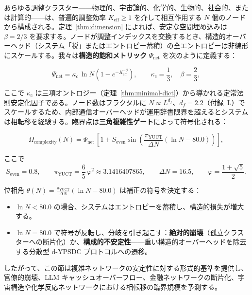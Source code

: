 \documentclass[12pt,a4paper]{article}
\newcommand{\Keff}{K_{\mathrm{eff}}}
\newcommand{\kappac}{\kappa_c}
\newcommand{\Seven}{S_{\mathrm{even}}}
\newcommand{\piYUCT}{\pi_{\mathrm{YUCT}}}
\theoremstyle{remark}
\begin{document}
	あらゆる調整クラスター——物理的、宇宙論的、化学的、生物的、社会的、または計算的——は、普遍的調整効率 \(\Keff \ge 1\) を介して相互作用する \(N\) 個のノードから構成される。定理~\ref{thm:dimension} によれば、安定な空間埋め込みは \(\beta = 2/3\) を要求する。ノードが調整インデックスを交換するとき、構造的オーバーヘッド（システム「税」またはエントロピー蓄積）の全エントロピーは非線形にスケールする。我々は\textbf{構造的飽和メトリック} \(\Psi_{\mathrm{net}}\) を次のように定義する：
	
	\begin{equation}
		\Psi_{\mathrm{net}} = \kappac \, \ln N \left(1 - e^{-\Keff^{-\beta}}\right),
		\qquad \kappac = \frac{1}{3},\quad \beta = \frac{2}{3},
		\label{eq:Psi_net}
	\end{equation}
	
	ここで \(\kappac\) は三項オントロジー（定理~\ref{thm:minimal-dict}）から導かれる定常法則安定化因子である。ノード数はフラクタルに \(N \propto L^{d_f}\)、\(d_f = 2.2\)（付録~L）でスケールするため、内部通信オーバーヘッドが運用辞書限界を超えるとシステムは相転移を経験する。臨界点は\textbf{三角複雑性ゲート}によって符号化される：
	
	\begin{equation}
		\Omega_{\mathrm{complexity}}(N) = \Psi_{\mathrm{net}} \,
		\left[1 + \Seven \sin\!\left( \frac{\piYUCT}{\Delta N} \left(\ln N - 80.0\right) \right) \right],
		\label{eq:Omega_complexity}
	\end{equation}
	
	ここで
	\[
	\Seven = 0.8,\qquad
	\piYUCT = \frac{6}{5}\,\varphi^2 \approx 3.1416407865,\qquad
	\Delta N = 16.5,\qquad
	\varphi = \frac{1+\sqrt{5}}{2}.
	\]
	
	位相角 \(\theta(N) = \frac{\piYUCT}{\Delta N} (\ln N - 80.0)\) は補正の符号を決定する：
	\begin{itemize}
		\item \(\ln N < 80.0\) の場合、システムはエントロピーを蓄積し、構造的損失が増大する。
		\item \(\ln N = 80.0\) で符号が反転し、分岐を引き起こす：\textbf{絶対的崩壊}（孤立クラスターへの断片化）か、\textbf{構成的不安定性}——重い構造的オーバーヘッドを除去する分散型 d-YPSDC プロトコルへの遷移。
	\end{itemize}
	
	したがって、この節は複雑ネットワークの安定性に対する形式的基準を提供し、官僚的崩壊、LLM キャッシュオーバーフロー、金融ネットワークの断片化、宇宙構造や化学反応ネットワークにおける相転移の臨界規模を予測する。
	
\end{document}
